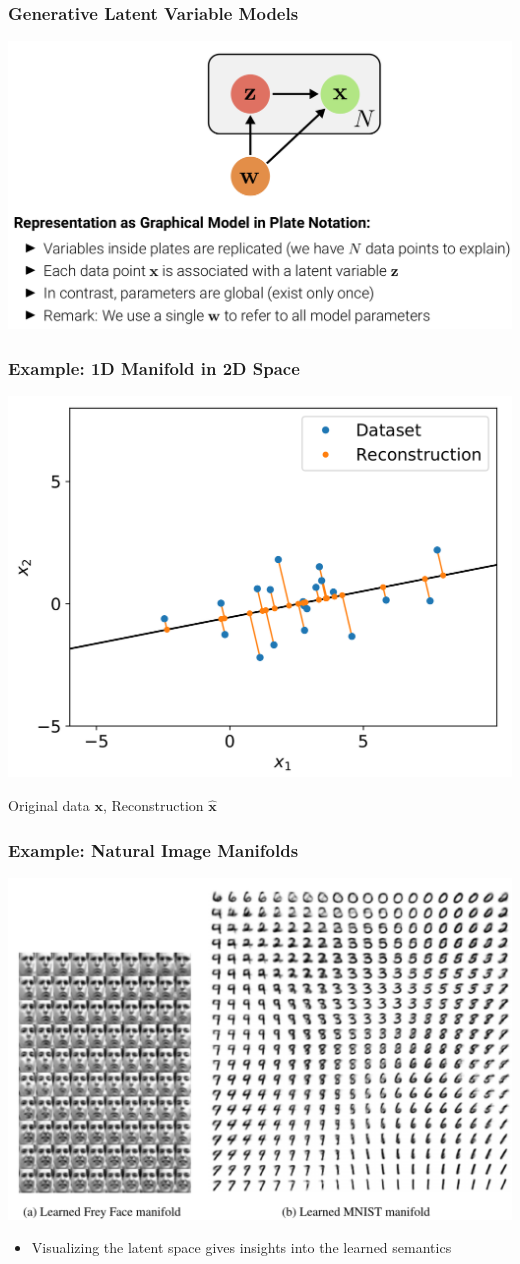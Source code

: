 \documentclass[10pt,aspectratio=169]{beamer}
\begin{document}
\begin{frame}
  \frametitle{Generative Latent Variable Models}
\begin{center}
\includegraphics[width=.8\textwidth]{images/s6}
\end{center}
\end{frame}



\begin{frame}
  \frametitle{Example: 1D Manifold in 2D Space}
\begin{center}
\includegraphics[width=.5\textwidth]{images/s7}
\end{center}
{\color{blue}Original data} $\mathbf{x}$, {\color{orange}Reconstruction} $\hat{\mathbf{x}}$

\end{frame}


\begin{frame}
  \frametitle{Example: Natural Image Manifolds}
\begin{center}
\includegraphics[width=.6\textwidth]{images/s8}
\end{center}
{\small{
\begin{itemize}
\item Visualizing the latent space gives insights into the learned semantics
\end{itemize}
}}
\end{frame}
\end{document}
